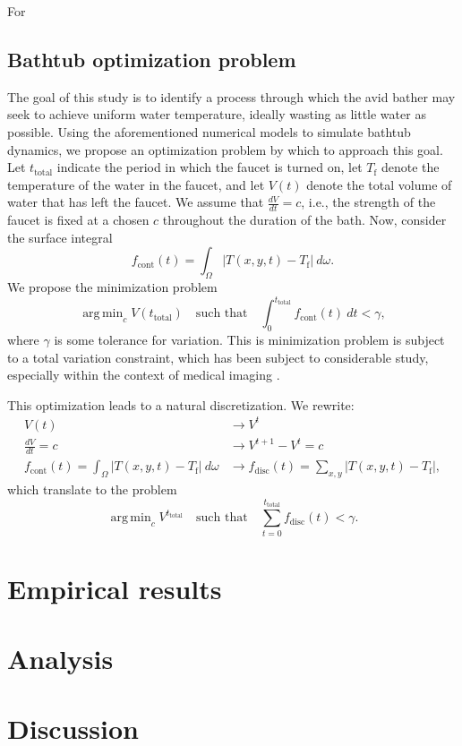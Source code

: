 \documentclass[12pt]{article}
\newcommand{\abs}[1]{\left|#1\right|}
\DeclareMathOperator*{\argmin}{\mathrm{arg\,min}}
\begin{document}
For 

\subsection{Bathtub optimization problem}

The goal of this study is to identify a process through which the avid bather
may seek to achieve uniform water temperature, ideally wasting as little water
as possible. Using the aforementioned numerical models to simulate bathtub
dynamics, we propose an optimization problem by which to approach this goal. Let
$t_{\mathrm{total}}$ indicate the period in which the faucet is turned on, let
$T_{\mathrm{f}}$ denote the temperature of the water in the faucet, and let
$V(t)$ denote the total volume of water that has left the faucet. We assume that
$\frac{dV}{dt} = c$, i.e., the strength of the faucet is fixed at a chosen $c$ throughout the
duration of the bath. Now, consider the surface integral
\begin{equation}
    f_{\mathrm{cont}}(t) = \int_{\Omega} \abs{T(x,y,t) - T_{\mathrm{f}}} \ d\omega.
    \label{eq:\theequation}
\end{equation}
We propose the minimization problem
\begin{equation}
    \argmin_{c} V(t_{\mathrm{total}}) \quad \text{such that} \quad \int_{0}^{t_{\mathrm{total}}}
    f_{\mathrm{cont}}(t) \ dt < \gamma,
    \label{eq:\theequation}
\end{equation}
where $\gamma$ is some tolerance for variation. This is minimization
problem is subject to a total variation constraint, which has been subject to
considerable study, especially within the context of medical imaging
\cite{Zhang2005}.

This optimization leads to a natural discretization. We rewrite:
\begin{align}
    V(t) &\longrightarrow V^t \\
    \frac{dV}{dt} = c &\longrightarrow V^{t+1} - V^t = c \\
    f_{\mathrm{cont}}(t) = \int_{\Omega} \abs{T(x,y,t) - T_{\mathrm{f}}} \
    d\omega &\longrightarrow f_{\mathrm{disc}}(t) = \sum_{x,y}\abs{T(x,y,t) -
        T_{\mathrm{f}}},
\end{align}
which translate to the problem
\begin{equation}
    \argmin_{c} V^{t_{\mathrm{total}}} \quad \text{such that} \quad
    \sum_{t=0}^{t_{\mathrm{total}}} f_{\mathrm{disc}}(t) < \gamma.
    \label{eq:\theequation}
\end{equation}

\section{Empirical results}

\section{Analysis}

\section{Discussion}

\nocite{air}

\printbibliography
\end{document}
